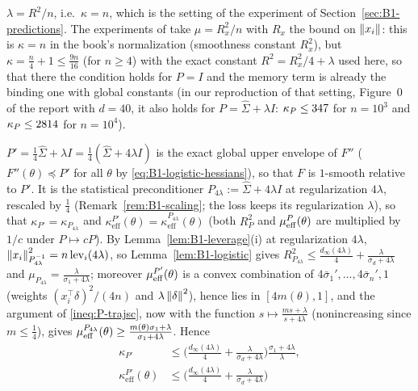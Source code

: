 \begin{remark}
$\lambda=R^2/n$, i.e.\ $\kappa=n$, which is the setting of the experiment of Section~\ref{sec:B1-predictions}.
The experiments of \cite[Sec.~5.4.4]{bach2024learning} take $\mu=R_x^2/n$ with $R_x$ the bound on
$\left\|x_i\right\|$: this is $\kappa=n$ in the book's normalization (smoothness constant $R_x^2$), but
$\kappa=\frac n4+1\le\frac{9n}{16}$ (for $n\ge4$) with the exact constant $R^2=R_x^2/4+\lambda$ used here, so
that there the condition holds for $P=I$ and the memory term is already the binding one with global constants
(in our reproduction of that setting, Figure~0 of the report with $d=40$, it also holds for
$P=\hat\Sigma+\lambda I$: $\kappa_P\le347$ for $n=10^3$ and $\kappa_P\le2814$ for $n=10^4$).
\end{remark}

\begin{remark}\label{rem:B1-quarter}
$P'=\frac14\hat\Sigma+\lambda I=\frac14(\hat\Sigma+4\lambda I)$ is the exact global upper envelope of
$F''$ ($F''(\theta)\preceq P'$ for all $\theta$ by \eqref{eq:B1-logistic-hessians}), so that $F$ is
$1$-smooth relative to $P'$. It is the statistical preconditioner $P_{4\lambda}:=\hat\Sigma+4\lambda I$ at
regularization $4\lambda$, rescaled by $\frac14$ (Remark~\ref{rem:B1-scaling}; the loss keeps its
regularization $\lambda$), so that $\kappa_{P'}=\kappa_{P_{4\lambda}}$ and
$\kappa^{P'}_{\mathrm{eff}}(\theta)=\kappa^{P_{4\lambda}}_{\mathrm{eff}}(\theta)$ (both $R_P^2$ and
$\mu_{\mathrm{eff}}^P(\theta)$ are multiplied by $1/c$ under $P\mapsto cP$). By Lemma~\ref{lem:B1-leverage}(i) at
regularization $4\lambda$, $\left\|x_i\right\|_{P_{4\lambda}^{-1}}^2=n\,\mathrm{lev}_i(4\lambda)$, so Lemma~\ref{lem:B1-logistic}
gives $R_{P_{4\lambda}}^2\le\frac{d_\infty(4\lambda)}4+\frac{\lambda}{\sigma_d+4\lambda}$ and
$\mu_{P_{4\lambda}}=\frac{\lambda}{\sigma_1+4\lambda}$; moreover $\mu_{\mathrm{eff}}^{P'}(\theta)$ is a convex combination
of $4\bar\sigma_1',\dots,4\bar\sigma_n',1$ (weights $(x_i^\top\delta)^2/(4n)$ and $\lambda\left\|\delta\right\|^2$),
hence lies in $[4m(\theta),1]$, and the argument of \eqref{ineq:P-trajsc}, now with the function
$s\mapsto\frac{ms+\lambda}{s+4\lambda}$ (nonincreasing since $m\le\frac14$), gives
$\mu_{\mathrm{eff}}^{P_{4\lambda}}(\theta)\ge\frac{m(\theta)\sigma_1+\lambda}{\sigma_1+4\lambda}$. Hence
\begin{align}
\kappa_{P'}&\le\Big(\frac{d_\infty(4\lambda)}4+\frac{\lambda}{\sigma_d+4\lambda}\Big)\frac{\sigma_1+4\lambda}{\lambda},\nonumber\\
\kappa^{P'}_{\mathrm{eff}}(\theta)&\le\Big(\frac{d_\infty(4\lambda)}4+\frac{\lambda}{\sigma_d+4\lambda}\Big)

\end{align}
\end{remark}
